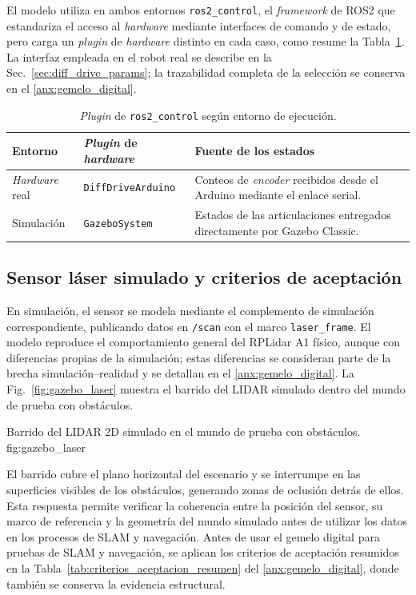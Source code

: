 El modelo utiliza en ambos entornos \texttt{ros2\_control}, el \textit{framework} de
\gls{ROS2} que estandariza el acceso al \textit{hardware} mediante interfaces de
comando y de estado, pero carga un \textit{plugin} de \textit{hardware} distinto en cada caso,
como resume la Tabla~\ref{tab:xacro_args_backend}. La interfaz empleada en el robot real se
describe en la Sec.~\ref{sec:diff_drive_params}; la trazabilidad completa de
la selección se conserva en el \ref{anx:gemelo_digital}.

\begin{table}[htbp]
\centering
\caption{\textit{Plugin} de \texttt{ros2\_control} según entorno de ejecución.}
\label{tab:xacro_args_backend}
\small
\begin{tabular}{p{2.5cm} p{4.0cm} p{7.0cm}}
\toprule
\textbf{Entorno} & \textbf{\textit{Plugin} de \textit{hardware}} & \textbf{Fuente de los estados} \\
\midrule
\textit{Hardware} real & \texttt{DiffDriveArduino} & Conteos de \textit{encoder} recibidos desde el \gls{Arduino} mediante el enlace serial. \\
Simulación & \texttt{GazeboSystem} & Estados de las articulaciones entregados directamente por Gazebo Classic. \\
\bottomrule
\end{tabular}
\end{table}

\subsection{Sensor láser simulado y criterios de aceptación}
\label{sec:laser_sim}

En simulación, el sensor se modela mediante el complemento de simulación correspondiente, publicando datos en \texttt{/scan} con el marco \texttt{laser\_frame}. El modelo reproduce el comportamiento general del RPLidar A1 físico, aunque con diferencias propias de la simulación; estas diferencias se consideran parte de la brecha simulación--realidad y se detallan en el \ref{anx:gemelo_digital}. La Fig.~\ref{fig:gazebo_laser} muestra el barrido del LIDAR simulado dentro del mundo de prueba con obstáculos.

{Barrido del LIDAR 2D simulado en el mundo de prueba con obstáculos.}
{fig:gazebo_laser}

El barrido cubre el plano horizontal del escenario y se interrumpe en las
superficies visibles de los obstáculos, generando zonas de oclusión detrás de
ellos. Esta respuesta permite verificar la coherencia entre la posición del
sensor, su marco de referencia y la geometría del mundo simulado antes de
utilizar los datos en los procesos de SLAM y navegación.
Antes de usar el gemelo digital para pruebas de SLAM y navegación, se aplican los criterios de aceptación resumidos en la Tabla~\ref{tab:criterios_aceptacion_resumen} del \ref{anx:gemelo_digital}, donde también se conserva la evidencia estructural.

